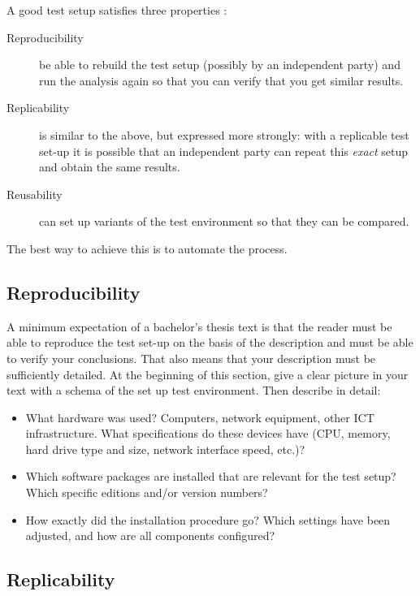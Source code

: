 A good test setup satisfies three properties \autocite{Liberman2015}:

\begin{description}
  \item[Reproducibility] be able to rebuild the test setup (possibly by an independent party) and run the analysis again so that you can verify that you get similar results.
  \item[Replicability] is similar to the above, but expressed more strongly: with a replicable test set-up it is possible that an independent party can repeat this \textit{exact} setup and obtain the same results.
  \item[Reusability] can set up variants of the test environment so that they can be compared.
\end{description}

The best way to achieve this is to automate the process.

\subsection{Reproducibility}
\label{ssec:reproducibility}

A minimum expectation of a bachelor's thesis text is that the reader must be able to reproduce the test set-up on the basis of the description and must be able to verify your conclusions. That also means that your description must be sufficiently detailed. At the beginning of this section, give a clear picture in your text with a schema of the set up test environment. Then describe in detail:

\begin{itemize}
 \item What hardware was used? Computers, network equipment, other ICT infrastructure. What specifications do these devices have (CPU, memory, hard drive type and size, network interface speed, etc.)?
 \item Which software packages are installed that are relevant for the test setup? Which specific editions and/or version numbers?
 \item How exactly did the installation procedure go? Which settings have been adjusted, and how are all components configured?
\end{itemize}

\subsection{Replicability}
\label{ssec:replicability}

